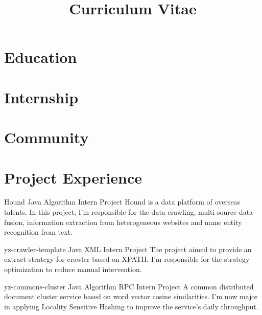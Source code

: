 \documentclass[11pt,a4paper]{moderncv}
\title{Curriculum Vitae}
\begin{document}
\maketitle

\section{Education}

\section{Internship}

\section{Community}

\section{Project Experience}

{Hound}
{Java Algorithm}
{Intern Project}{}
{
Hound is a data platform of overseas talents. In this project, I'm responsible for the data crawling, multi-source data fusion, information extraction from heterogeneous websites and name entity recognition from text.
}

\vspace*{0.2\baselineskip}
{yz-crawler-template}
{Java XML}
{Intern Project}{}
{The project aimed to provide an extract strategy for crawler based on XPATH. I'm responsible for the strategy optimization to reduce manual intervention.}

\vspace*{0.2\baselineskip}
{yz-commons-cluster}
{Java Algorithm RPC}
{Intern Project}{}
{A common distributed document cluster service based on word vector cosine similarities. I'm now major in applying Locality Sensitive Hashing to improve the service's daily throughput.}
\end{document}
